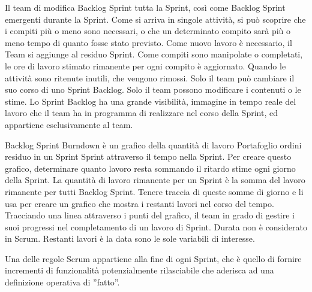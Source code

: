 Il team di modifica Backlog Sprint tutta la Sprint, cos\`i come Backlog Sprint emergenti durante la Sprint. Come si
arriva in singole attivit\`a, si pu\`o scoprire che i compiti pi\`u o meno sono necessari, o che un determinato compito
sar\`a pi\`u o meno tempo di quanto fosse stato previsto. Come nuovo lavoro \`e necessario, il Team si aggiunge al
residuo Sprint. Come compiti sono manipolate o completati, le ore di lavoro stimato rimanente per ogni compito \`e
aggiornato. Quando le attivit\`a sono ritenute inutili, che vengono rimossi. Solo il team pu\`o cambiare il suo corso
di uno Sprint Backlog. Solo il team possono modificare i contenuti o le stime. Lo Sprint Backlog ha una grande
visibilit\`a, immagine in tempo reale del lavoro che il team ha in programma di realizzare nel corso della Sprint, ed
appartiene esclusivamente al team.\\ 
\linebreak

Backlog Sprint Burndown \`e un grafico della quantit\`a di lavoro Portafoglio ordini residuo in un Sprint Sprint
attraverso il tempo nella Sprint. Per creare questo grafico, determinare quanto lavoro resta sommando il ritardo stime
ogni giorno della Sprint. La quantit\`a di lavoro rimanente per un Sprint \`e la somma del lavoro rimanente per tutti
Backlog Sprint. Tenere traccia di queste somme di giorno e li usa per creare un grafico che mostra i restanti lavori
nel corso del tempo. Tracciando una linea attraverso i punti del grafico, il team in grado di gestire i suoi progressi
nel completamento di un lavoro di Sprint. Durata non \`e considerato in Scrum. Restanti lavori \`e la data sono le sole
variabili di interesse.\\ 
\linebreak 

Una delle regole Scrum appartiene alla fine di ogni Sprint, che \`e quello di fornire incrementi di funzionalit\`a
potenzialmente rilasciabile che aderisca ad una definizione operativa di ''fatto''.

\vspace{0.4cm}
\vspace{0.4cm}
\linebreak

